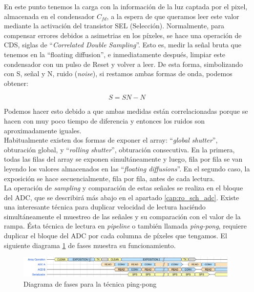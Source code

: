 En este punto tenemos la carga con la información de la luz captada por el pixel,
almacenada en el condensador $C_{fd}$, a la espera de que queramos leer este valor
mediante la activación del transistor SEL (Selección). Normalmente, para compensar
errores debidos a asimetrias en los píxeles, se hace una operación de CDS, siglas de
``\textit{Correlated Double Sampling}''. Esto es, medir la señal bruta que tenemos
en la ``floating diffusion'', e inmediatamente después, limpiar este condensador con
un pulso de Reset y volver a leer. De esta forma, simbolizando con S, señal y N,
ruido (\textit{noise}), si restamos ambas formas de onda, podemos obtener:

\begin{equation}
	\label{eq:CDS_operation}
	S = SN - N
\end{equation}

Podemos hacer esto debido a que ambas medidas  están correlacionadas porque se
hacen con muy poco tiempo de diferencia y entonces los ruidos son aproximadamente
iguales.\\

Habitualmente existen dos formas de exponer el array: ``\textit{global shutter}'',
obturación global, y ``\textit{rolling shutter}'', obturación consecutiva. En la
primera, todas las filas del array se exponen simultáneamente y luego, fila por fila
se van leyendo los valores almacenados en las ``\textit{floating diffusions}''. En
el segundo caso, la exposición se hace secuencialmente, fila por fila, antes de cada
lectura.\\

La operación de \textit{sampling} y comparación de estas señales se realiza en el
bloque del ADC, que se describirá más abajo en el apartado \ref{cap:ro_sch_adc}.
Existe una interesante técnica para duplicar velocidad de lectura haciéndo
simultáneamente el muestreo de las señales y su comparación con el valor de la rampa.
Ésta técnica de lectura en \textit{pipeline} o también llamada \textit{ping-pong},
requiere duplicar el bloque del ADC por cada columna de píxeles que tengamos. El
siguiente diagrama \ref{fig:ping_pong} de fases muestra su funcionamiento.\\

\begin{figure}[h]
	\centering
	\includegraphics[width=\textwidth]{img/ping-pong_wave.png}
	\caption{Diagrama de fases para la técnica ping-pong}
	\label{fig:ping_pong}
\end{figure}


